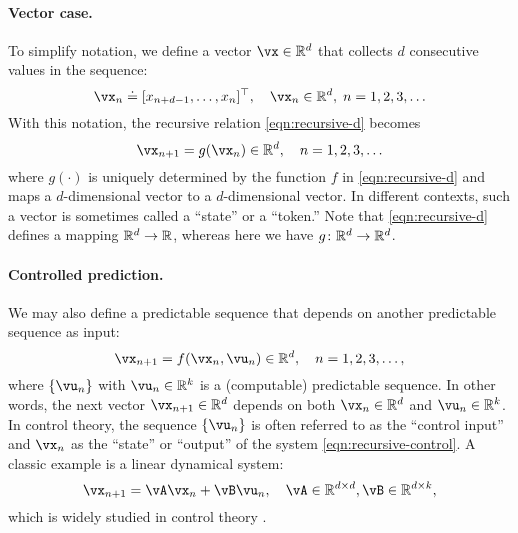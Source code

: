 \documentclass[../../book-main.tex]{subfiles}
\begin{document}
\paragraph{Vector case.}
To simplify notation, we define a vector \(\vx \in \R^{d}\) that collects \(d\) consecutive values in the sequence:
\begin{equation}
    \vx_{n} \doteq [x_{n+d-1}, \ldots, x_{n}]^{\top}, \quad \vx_{n} \in \R^{d}, \; n = 1, 2, 3, \ldots
\end{equation}
With this notation, the recursive relation \eqref{eqn:recursive-d} becomes
\begin{equation}
    \vx_{n+1} = g(\vx_{n}) \in \R^{d}, \quad n = 1, 2, 3, \ldots
    \label{eqn:recursive-v}
\end{equation}
where \(g(\cdot)\) is uniquely determined by the function \(f\) in \eqref{eqn:recursive-d} and maps a \(d\)-dimensional vector to a \(d\)-dimensional vector. In different contexts, such a vector is sometimes called a ``state'' or a ``token.'' Note that \eqref{eqn:recursive-d} defines a mapping \(\mathbb{R}^{d} \to \mathbb{R}\), whereas here we have \(g \colon \mathbb{R}^{d} \to \mathbb{R}^{d}\).

\paragraph{Controlled prediction.}
We may also define a predictable sequence that depends on another predictable sequence as input:
\begin{equation}
    \vx_{n+1} = f(\vx_{n}, \vu_{n}) \in \R^{d}, \quad n = 1, 2, 3, \ldots,
    \label{eqn:recursive-control}
\end{equation}
where \(\{\vu_{n}\}\) with \(\vu_{n} \in \R^{k}\) is a (computable) predictable sequence. In other words, the next vector \(\vx_{n+1} \in \R^{d}\) depends on both \(\vx_{n} \in \R^{d}\) and \(\vu_{n} \in \R^{k}\). In control theory, the sequence \(\{\vu_{n}\}\) is often referred to as the ``control input'' and \(\vx_{n}\) as the ``state'' or ``output'' of the system \eqref{eqn:recursive-control}. A classic example is a linear dynamical system:
\begin{equation}
    \vx_{n+1} = \vA\vx_{n} + \vB\vu_{n}, \quad \vA \in \R^{d \times d}, \vB \in \R^{d \times k},
    \label{eqn:lineary-system} 
\end{equation}
which is widely studied in control theory \cite{Cal:Des}. 
\end{document}
